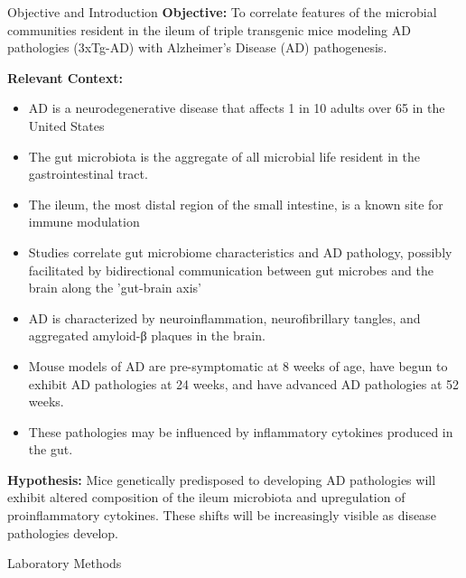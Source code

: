 \documentclass[final]{beamer}
\newlength{\colwidth}
\begin{document}
\begin{frame}[t]
\begin{columns}[t]
\begin{column}{\colwidth}
\begin{block}{Objective and Introduction}
    \textbf{Objective:} To correlate features of the microbial communities
    resident in the ileum of triple transgenic mice modeling AD pathologies
    (3xTg-AD) with Alzheimer's Disease (AD) pathogenesis.

    \textbf{Relevant Context:}
    \begin{itemize}
      \item AD is a neurodegenerative disease that affects 1 in 10 adults over 65 in the United States
      \item The gut microbiota is the aggregate of all microbial life resident in the gastrointestinal tract.
      \item The ileum, the most distal region of the small intestine, is a known site for immune modulation
      \item Studies correlate gut microbiome characteristics and AD pathology, possibly facilitated by bidirectional communication between gut microbes and the brain along the 'gut-brain axis'
      \item AD is characterized by neuroinflammation, neurofibrillary tangles, and aggregated amyloid-β plaques in the brain.
      \item Mouse models of AD are pre-symptomatic at 8 weeks of age, have begun to exhibit AD pathologies at 24 weeks, and have advanced AD pathologies at 52 weeks.
      \item These pathologies may be influenced by inflammatory cytokines produced in the gut.
    \end{itemize}

    \textbf{Hypothesis:}
    Mice genetically predisposed to developing AD pathologies will exhibit
    altered composition of the ileum microbiota and upregulation of
    proinflammatory cytokines. These shifts will be increasingly visible as
    disease pathologies develop.
      
  \end{block}

  \begin{block}{Laboratory Methods}


\end{block}
\end{column}
\end{columns}
\end{frame}
\end{document}
